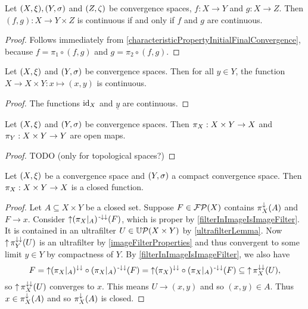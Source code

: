\begin{lemma} \label{continuityFunctionTuple}
Let $\sSet{X,\xi}, \sSet{Y,\sigma}$ and $\sSet{Z,\zeta}$ be convergence spaces, $f: X\to Y$ and $g: X\to Z$. Then $(f,g): X\to Y\times Z$ is continuous \textup{if and only if} $f$ and $g$ are continuous.
\end{lemma}
\begin{proof}
Follows immediately from \ref{characteristicPropertyInitialFinalConvergence},
because $f = \pi_1\circ (f,g)$ and $g = \pi_2\circ (f,g)$.
\end{proof}
\begin{corollary} \label{continuousEmbeddingProduct}
Let $\sSet{X,\xi}$ and $\sSet{Y,\sigma}$ be convergence spaces. Then for all $y\in Y$, the function $X\to X\times Y: x\mapsto (x,y)$ is continuous.
\end{corollary}
\begin{proof}
The functions $\operatorname{id}_X$ and $\underline{y}$ are continuous.
\end{proof}

\begin{lemma}
Let $\sSet{X,\xi}$ and $\sSet{Y,\sigma}$ be convergence spaces. Then $\pi_X: X\times Y\to X$ and $\pi_Y: X\times Y\to Y$ are open maps.
\end{lemma}
\begin{proof}
TODO (only for topological spaces?)
\end{proof}

\begin{lemma} \label{projectionClosedFunction}
Let $\sSet{X,\xi}$ be a convergence space and $\sSet{Y,\sigma}$ a compact convergence space. Then $\pi_X: X\times Y\to X$ is a closed function.
\end{lemma}
\begin{proof}
Let $A\subseteq X\times Y$ be a closed set. Suppose $F\in \operatorname{\mathcal{FP}}(X)$ contains $\pi_X^\downarrow(A)$ and $F\to x$. Consider $\operatorname{\uparrow}(\pi_X|_A)^{{\text{\hspace{0.15em}-}\downarrow}\downarrow}(F)$, which is proper by \ref{filterInImageIsImageFilter}. It is contained in an ultrafilter $U\in\operatorname{\mathbb{U}\mathcal{P}}(X\times Y)$ by \ref{ultrafilterLemma}. Now $\operatorname{\uparrow}\pi_Y^{\downarrow\downarrow}(U)$ is an ultrafilter by \ref{imageFilterProperties} and thus convergent to some limit $y\in Y$ by compactness of $Y$. By \ref{filterInImageIsImageFilter}, we also have
\[ F = \operatorname{\uparrow}(\pi_X|_A)^{\downarrow\downarrow}\circ(\pi_X|_A)^{{\text{\hspace{0.15em}-}\downarrow}\downarrow}(F) = \operatorname{\uparrow}(\pi_X)^{\downarrow\downarrow}\circ(\pi_X|_A)^{{\text{\hspace{0.15em}-}\downarrow}\downarrow}(F) \subseteq \operatorname{\uparrow}\pi_X^{\downarrow\downarrow}(U), \]
so $\operatorname{\uparrow}\pi_X^{\downarrow\downarrow}(U)$ converges to $x$. This means $U\to (x,y)$ and so $(x,y)\in A$. Thus $x\in \pi_X^\downarrow(A)$ and so $\pi_X^\downarrow(A)$ is closed.
\end{proof}

